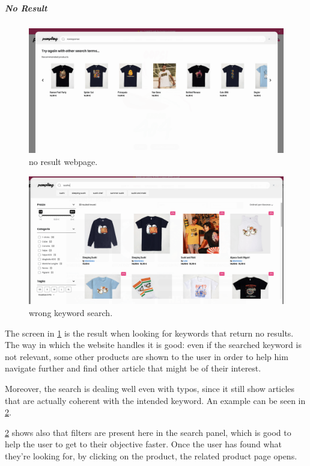 \subparagraph{No Result}
\begin{figure}[h!]
	\centering
	\includegraphics[scale=0.225]{images/zero-res.png}
	\caption{no result webpage.}
	\label{fig:zero-res}
\end{figure}

\begin{figure}[h!]
	\centering
	\includegraphics[scale=0.225]{images/wrong-search.png}
	\caption{wrong keyword search.}
	\label{fig:wrong-search}
\end{figure}

The screen in \cref{fig:zero-res} is the result when looking for keywords that return no results.
The way in which the website handles it is good: even if the searched keyword is not relevant, some other products are shown
to the user in order to help him navigate further and find other article that might be of their interest.

Moreover, the search is dealing well even with typos, since it still show articles that are actually coherent with the 
intended keyword. An example can be seen in \cref{fig:wrong-search}.

\cref{fig:wrong-search} shows also that filters are present here in the search panel, which is good to 
help the user to get to their objective faster.
Once the user has found what they're looking for, by clicking on the product, the related product page opens.

